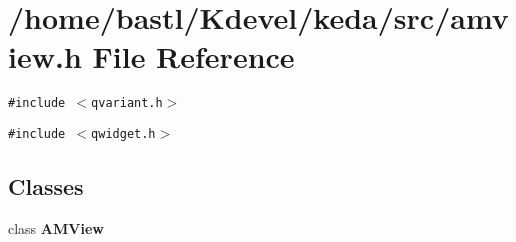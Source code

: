 \section{/home/bastl/Kdevel/keda/src/amview.h File Reference}
\label{amview_8h}
{\tt \#include $<$qvariant.h$>$}\par
{\tt \#include $<$qwidget.h$>$}\par
\subsection*{Classes}
\begin{CompactItemize}
\item 
class {\bf AMView}
\end{CompactItemize}
